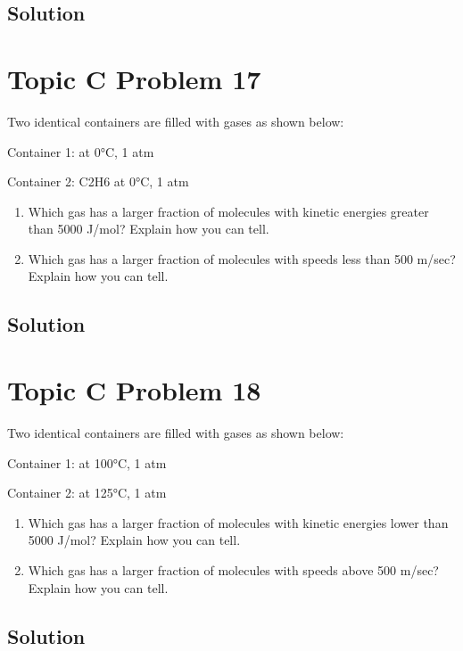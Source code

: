 \documentclass[10pt]{article}
\begin{document}
        \subsection{Solution}

    \pagebreak
    \section{Topic C Problem 17}
        Two identical containers are filled with gases as shown below: 
        
        Container 1:  at 0\unit{\celsius}, 1 atm 
        
        Container 2: C2H6 at 0\unit{\celsius}, 1 atm

        \begin{enumerate} [label=\alph*)]
            \item Which gas has a larger fraction of molecules with kinetic energies greater than 5000 J/mol? Explain how you can tell.
            \item Which gas has a larger fraction of molecules with speeds less than 500 m/sec? Explain how you can tell.
        \end{enumerate}

        \subsection{Solution}

    \pagebreak
    \section{Topic C Problem 18}
        Two identical containers are filled with gases as shown below:

        Container 1:  at 100\unit{\celsius}, 1 atm 
        
        Container 2:  at 125\unit{\celsius}, 1 atm

        \begin{enumerate} [label=\alph*)]
            \item Which gas has a larger fraction of molecules with kinetic energies lower than 5000 J/mol? Explain how you can tell.
            \item Which gas has a larger fraction of molecules with speeds above 500 m/sec? Explain how you can tell.
        \end{enumerate}

        \subsection{Solution}
\end{document}
